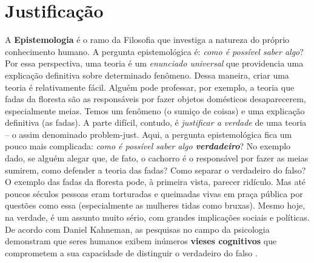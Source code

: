 \documentclass[./main.tex]{subfiles}
\begin{document}
\section{Justificação} \label{sec:epis:justific}

\par A \textbf{Epistemologia} é o ramo da Filosofia que investiga a natureza do próprio conhecimento humano. A pergunta epistemológica é: \textit{como é possível saber algo}? Por essa perspectiva, uma \gls{teoria} é um \textit{enunciado universal} que providencia uma explicação definitiva sobre determinado fenômeno. Dessa maneira, criar uma teoria é relativamente fácil. Alguém pode professar, por exemplo, a teoria que fadas da floresta são as responsáveis por fazer objetos domésticos desaparecerem, especialmente meias. Temos um fenômeno (o sumiço de coisas) e uma explicação definitiva (as fadas). A parte difícil, contudo, é \textit{justificar a verdade} de uma teoria -- o assim denominado \gls{problem-just}. Aqui, a pergunta epistemológica fica um pouco mais complicada: \textit{como é possível saber algo \textbf{verdadeiro}}? No exemplo dado, se alguém alegar que, de fato, o cachorro é o responsável por fazer as meias sumirem, como defender a teoria das fadas? Como separar o verdadeiro do falso? O exemplo das fadas da floresta pode, à primeira vista, parecer ridículo. Mas até poucos séculos pessoas eram torturadas e queimadas vivas em praça pública por questões como essa (especialmente as mulheres tidas como bruxas). Mesmo hoje, na verdade, é um assunto muito sério, com grandes implicações sociais e políticas. De acordo com Daniel Kahneman, as pesquisas no campo da psicologia demonstram que seres humanos exibem inúmeros \textbf{vieses cognitivos} que comprometem a sua capacidade de distinguir o verdadeiro do falso \cite{kahneman2011}.  
\end{document}
